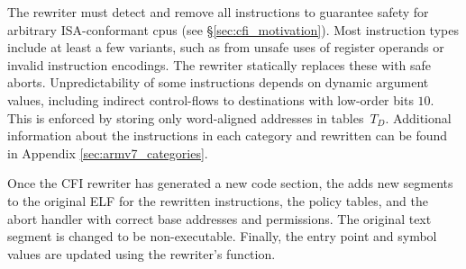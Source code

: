 {    
    The rewriter must detect and remove all \unpredictable{} instructions to guarantee safety for arbitrary ISA-conformant cpus (see \S\ref{sec:cfi_motivation}). Most instruction types include at least a few \unpredictable{} variants, such as from unsafe uses of \PC register operands or invalid instruction encodings. The rewriter statically replaces these with safe aborts. Unpredictability of some instructions depends on dynamic argument values, including indirect control-flows to destinations with low-order bits $10$. This is enforced by storing only word-aligned addresses in tables~$T_D$.
}
Additional information about the instructions in each category and rewritten \Blocks can be found in Appendix \ref{sec:armv7_categories}.

Once the CFI rewriter has generated a new code section, the \ELFPackager adds new segments to the original ELF for the rewritten instructions, the policy tables, and the abort handler with correct base addresses and permissions. The original text segment is changed to be non-executable. Finally, the entry point and symbol values are updated using the rewriter's \itoip function.



